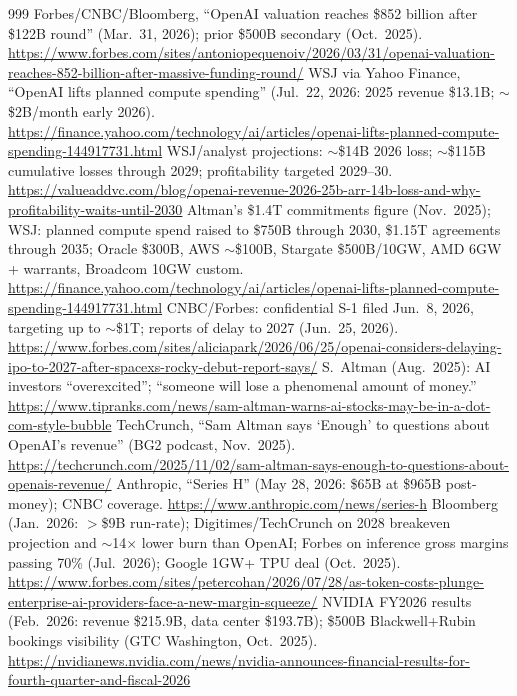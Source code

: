 \begin{thebibliography}{999}
 Forbes/CNBC/Bloomberg, ``OpenAI valuation reaches \$852 billion after \$122B round'' (Mar.\ 31, 2026); prior \$500B secondary (Oct.\ 2025). \url{https://www.forbes.com/sites/antoniopequenoiv/2026/03/31/openai-valuation-reaches-852-billion-after-massive-funding-round/}
 WSJ via Yahoo Finance, ``OpenAI lifts planned compute spending'' (Jul.\ 22, 2026: 2025 revenue \$13.1B; $\sim$\$2B/month early 2026). \url{https://finance.yahoo.com/technology/ai/articles/openai-lifts-planned-compute-spending-144917731.html}
 WSJ/analyst projections: $\sim$\$14B 2026 loss; $\sim$\$115B cumulative losses through 2029; profitability targeted 2029--30. \url{https://valueaddvc.com/blog/openai-revenue-2026-25b-arr-14b-loss-and-why-profitability-waits-until-2030}
 Altman's \$1.4T commitments figure (Nov.\ 2025); WSJ: planned compute spend raised to \$750B through 2030, \$1.15T agreements through 2035; Oracle \$300B, AWS $\sim$\$100B, Stargate \$500B/10GW, AMD 6GW + warrants, Broadcom 10GW custom. \url{https://finance.yahoo.com/technology/ai/articles/openai-lifts-planned-compute-spending-144917731.html}
 CNBC/Forbes: confidential S-1 filed Jun.\ 8, 2026, targeting up to $\sim$\$1T; reports of delay to 2027 (Jun.\ 25, 2026). \url{https://www.forbes.com/sites/aliciapark/2026/06/25/openai-considers-delaying-ipo-to-2027-after-spacexs-rocky-debut-report-says/}
 S.~Altman (Aug.\ 2025): AI investors ``overexcited''; ``someone will lose a phenomenal amount of money.'' \url{https://www.tipranks.com/news/sam-altman-warns-ai-stocks-may-be-in-a-dot-com-style-bubble}
 TechCrunch, ``Sam Altman says `Enough' to questions about OpenAI's revenue'' (BG2 podcast, Nov.\ 2025). \url{https://techcrunch.com/2025/11/02/sam-altman-says-enough-to-questions-about-openais-revenue/}
 Anthropic, ``Series H'' (May 28, 2026: \$65B at \$965B post-money); CNBC coverage. \url{https://www.anthropic.com/news/series-h}
 Bloomberg (Jan.\ 2026: $>$\$9B run-rate); Digitimes/TechCrunch on 2028 breakeven projection and $\sim$14$\times$ lower burn than OpenAI; Forbes on inference gross margins passing 70\% (Jul.\ 2026); Google 1GW+ TPU deal (Oct.\ 2025). \url{https://www.forbes.com/sites/petercohan/2026/07/28/as-token-costs-plunge-enterprise-ai-providers-face-a-new-margin-squeeze/}
 NVIDIA FY2026 results (Feb.\ 2026: revenue \$215.9B, data center \$193.7B); \$500B Blackwell+Rubin bookings visibility (GTC Washington, Oct.\ 2025). \url{https://nvidianews.nvidia.com/news/nvidia-announces-financial-results-for-fourth-quarter-and-fiscal-2026}

\end{thebibliography}
